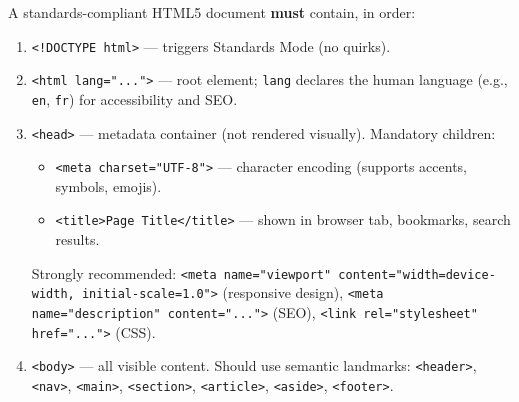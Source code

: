 \documentclass[11pt]{article}
\begin{document}
\begin{propriete}
A standards-compliant HTML5 document \textbf{must} contain, in order:
\begin{enumerate}
    \item \texttt{<!DOCTYPE html>} — triggers Standards Mode (no quirks).
    \item \texttt{<html lang="...">} — root element; \texttt{lang} declares the human language (e.g., \texttt{en}, \texttt{fr}) for accessibility and SEO.
    \item \texttt{<head>} — metadata container (not rendered visually). Mandatory children:
        \begin{itemize}
            \item \texttt{<meta charset="UTF-8">} — character encoding (supports accents, symbols, emojis).
            \item \texttt{<title>Page Title</title>} — shown in browser tab, bookmarks, search results.
        \end{itemize}
        Strongly recommended: \texttt{<meta name="viewport" content="width=device-width, initial-scale=1.0">} (responsive design), \texttt{<meta name="description" content="...">} (SEO), \texttt{<link rel="stylesheet" href="...">} (CSS).
    \item \texttt{<body>} — all visible content. Should use semantic landmarks: \texttt{<header>}, \texttt{<nav>}, \texttt{<main>}, \texttt{<section>}, \texttt{<article>}, \texttt{<aside>}, \texttt{<footer>}.
\end{enumerate}
\end{propriete}
\end{document}
